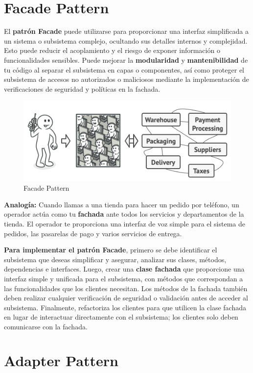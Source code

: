 \section{Facade Pattern}

El \textbf{patrón Facade} puede utilizarse para proporcionar una interfaz simplificada a un sistema o subsistema complejo, ocultando sus detalles internos y complejidad. Esto puede reducir el acoplamiento y el riesgo de exponer información o funcionalidades sensibles. Puede mejorar la \textbf{modularidad} y \textbf{mantenibilidad} de tu código al separar el subsistema en capas o componentes, así como proteger el subsistema de accesos no autorizados o maliciosos mediante la implementación de verificaciones de seguridad y políticas en la fachada. 

\begin{figure}[H]
    \centering
    \includegraphics[width=0.5\linewidth]{PatronesSoftware/facade.png}
    \caption{Facade Pattern}
    \label{fig:facade-pattern}
\end{figure}

\textbf{Analogía:} Cuando llamas a una tienda para hacer un pedido por teléfono, un operador actúa como tu \textbf{fachada} ante todos los servicios y departamentos de la tienda. El operador te proporciona una interfaz de voz simple para el sistema de pedidos, las pasarelas de pago y varios servicios de entrega. 

\textbf{Para implementar el patrón Facade}, primero se debe identificar el subsistema que deseas simplificar y asegurar, analizar sus clases, métodos, dependencias e interfaces. Luego, crear una\textbf{ clase fachada }que proporcione una interfaz simple y unificada para el subsistema, con métodos que correspondan a las funcionalidades que los clientes necesitan. Los métodos de la fachada también deben realizar cualquier verificación de seguridad o validación antes de acceder al subsistema. Finalmente, refactoriza los clientes para que utilicen la clase fachada en lugar de interactuar directamente con el subsistema; los clientes solo deben comunicarse con la fachada.

\section{Adapter Pattern}

